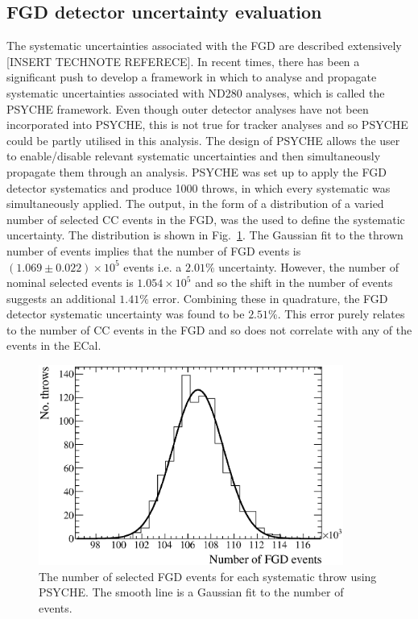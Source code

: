 \subsection{FGD detector uncertainty evaluation}
\label{subsec:FGDDetectorSystematics}
The systematic uncertainties associated with the FGD are described extensively [INSERT TECHNOTE REFERECE].  In recent times, there has been a significant push to develop a framework in which to analyse and propagate systematic uncertainties associated with ND280 analyses, which is called the PSYCHE framework.  Even though outer detector analyses have not been incorporated into PSYCHE, this is not true for tracker analyses and so PSYCHE could be partly utilised in this analysis.  The design of PSYCHE allows the user to enable/disable relevant systematic uncertainties and then simultaneously propagate them through an analysis.  PSYCHE was set up to apply the FGD detector systematics and produce 1000 throws, in which every systematic was simultaneously applied.  The output, in the form of a distribution of a varied number of selected CC events in the FGD, was the used to define the systematic uncertainty.  The distribution is shown in Fig.~\ref{fig:FGDSystematicsNEvents}.  The Gaussian fit to the thrown number of events implies that the number of FGD events is $(1.069\pm0.022)\times10^5$ events i.e. a $2.01\%$ uncertainty.  However, the number of nominal selected events is $1.054\times10^5$ and so the shift in the number of events suggests an additional $1.41\%$ error.  Combining these in quadrature, the FGD detector systematic uncertainty was found to be $2.51\%$.  This error purely relates to the number of CC events in the FGD and so does not correlate with any of the events in the ECal.
\begin{figure}
  \centering
  \includegraphics[width=10cm]{images/measurement/systematics/detector/fgd/fgd_systematics_nevents.eps}
  \caption{The number of selected FGD events for each systematic throw using PSYCHE.  The smooth line is a Gaussian fit to the number of events.}
  \label{fig:FGDSystematicsNEvents}
\end{figure}
